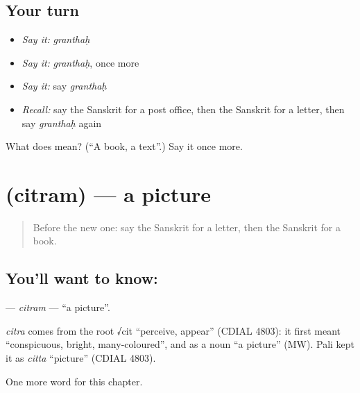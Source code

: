 \subsection*{Your turn}
\begin{itemize}
\raggedright
  \item \emph{Say it:} \emph{granthaḥ}
  \item \emph{Say it:} \emph{granthaḥ}, once more
  \item \emph{Say it:} say \emph{granthaḥ}
  \item \emph{Recall:} say the Sanskrit for a post office, then the Sanskrit for a letter, then say \emph{granthaḥ} again
\end{itemize}

\begin{tcolorbox}[breakable,colback=teal!4,colframe=teal!35!black,title={Before you move on}]
What does  mean? (\textquotedblleft{}A book, a text\textquotedblright{}.) Say it once more.
\end{tcolorbox}
\section[\texorpdfstring{\sk{चित्रम्} (citram)}{चित्रम् (citram)}]{ (citram) — a picture}

\label{lesson:SA-C120-citram}



\begin{quote}
Before the new one: say the Sanskrit for a letter, then the Sanskrit for a book.
\end{quote}

\subsection*{You'll want to know: }
\textbf{} — \emph{citram} — \textquotedblleft{}a picture\textquotedblright{}.

\begin{cousinweb}
\emph{citra} comes from the root √cit \textquotedblleft{}perceive, appear\textquotedblright{} (CDIAL 4803): it first meant \textquotedblleft{}conspicuous, bright, many-coloured\textquotedblright{}, and as a noun \textquotedblleft{}a picture\textquotedblright{} (MW). Pali kept it as \emph{citta} \textquotedblleft{}picture\textquotedblright{} (CDIAL 4803).
\end{cousinweb}

\begin{grammarlens}[title={What you've built}]
One more word for this chapter.
\end{grammarlens}

